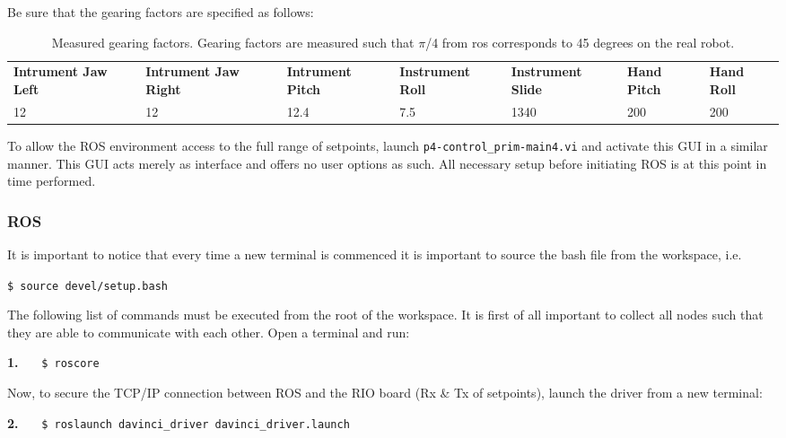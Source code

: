 Be sure that the gearing factors are specified as follows:
\begin{table}[H]
\begin{tabularx}{\textwidth}{X X X X X X X}
\rowcolor{HeaderBlue} 
\scriptsize \textbf{Intrument Jaw Left} &\scriptsize  \textbf{Intrument Jaw Right} &\scriptsize  \textbf{Intrument Pitch} &\scriptsize  \textbf{Instrument Roll} &\scriptsize  \textbf{Instrument Slide} & \scriptsize   \textbf{Hand Pitch} &  \scriptsize\textbf{Hand Roll}\\
12 & 12 & 12.4 & 7.5 & 1340 & 200 & 200\\
\end{tabularx}
	\caption{Measured gearing factors. Gearing factors are measured such that $\pi$/4 from \gls{ros} corresponds to 45 degrees on the real robot.}
\label{tab:gearing}
\end{table}
To allow the ROS environment access to the full range of setpoints, launch \texttt{p4-control\_prim-main4.vi} and activate this GUI in a similar manner. This GUI acts merely as interface and offers no user options as such. All necessary setup before initiating ROS is at this point in time performed.
\subsubsection*{ROS}
It is important to notice that every time a new terminal is commenced it is important to source the bash file from the workspace, i.e.
\vspace{0.2cm}


\hspace{1cm} \texttt{\$ source devel/setup.bash}
\vspace{0.2cm}


The following list of commands must be executed from the root of the workspace. It is first of all important to collect all \gls{node}s such that they are able to communicate with each other. Open a terminal and run:
\vspace{0.2cm}


\hspace{1cm} \textbf{1.} \ \ \ \texttt{\$ roscore} \ \ \ {}
\vspace{0.2cm}


Now, to secure the TCP/IP connection between ROS and the RIO board (Rx \& Tx of setpoints), launch the driver from a new terminal:
\vspace{0.2cm}


\hspace{1cm} \textbf{2.} \ \ \  \texttt{\$ roslaunch davinci\_driver davinci\_driver.launch} \ \ \ {} 
\vspace{0.2cm}


